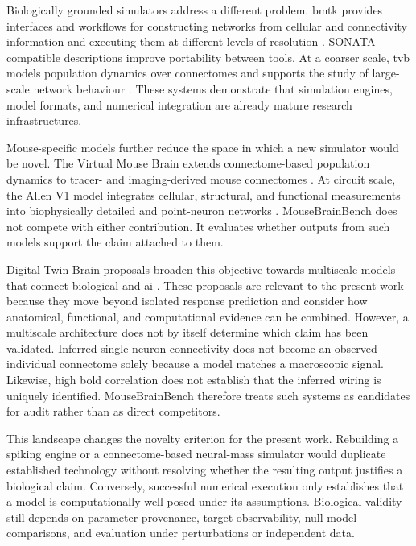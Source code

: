 Biologically grounded simulators address a different problem. \ac{bmtk}
provides interfaces and workflows for constructing networks from cellular and
connectivity information and executing them at different levels of resolution
\citep{dai2020bmtk}. SONATA-compatible descriptions improve
portability between tools. At a coarser scale, \ac{tvb} models
population dynamics over connectomes and supports the study of large-scale
network behaviour \citep{tvb2013}. These systems demonstrate that simulation
engines, model formats, and numerical integration are already mature research
infrastructures.

Mouse-specific models further reduce the space in which a new simulator would
be novel. The Virtual Mouse Brain extends connectome-based population dynamics
to tracer- and imaging-derived mouse connectomes
\citep{melozzi2017virtualmouse}. At circuit scale, the Allen V1 model integrates
cellular, structural, and functional measurements into biophysically detailed
and point-neuron networks \citep{billeh2020v1}. MouseBrainBench does not compete
with either contribution. It evaluates whether outputs from such models support
the claim attached to them.

Digital Twin Brain proposals broaden this objective towards multiscale models
that connect biological and \acs{ai} \citep{xiong2023dtb}. These proposals are
relevant to the present work because they move beyond isolated response
prediction and consider how anatomical, functional, and computational evidence
can be combined. However, a multiscale architecture does not by itself determine
which claim has been validated. Inferred single-neuron connectivity does not
become an observed individual connectome solely because a model matches a
macroscopic signal. Likewise, high \acs{bold} correlation does not establish that
the inferred wiring is uniquely identified. MouseBrainBench therefore treats
such systems as candidates for audit rather than as direct competitors.

This landscape changes the novelty criterion for the present work. Rebuilding a
spiking engine or a connectome-based neural-mass simulator would duplicate
established technology without resolving whether the resulting output justifies
a biological claim. Conversely, successful numerical execution only establishes
that a model is computationally well posed under its assumptions. Biological
validity still depends on parameter provenance, target observability, null-model
comparisons, and evaluation under perturbations or independent data.

